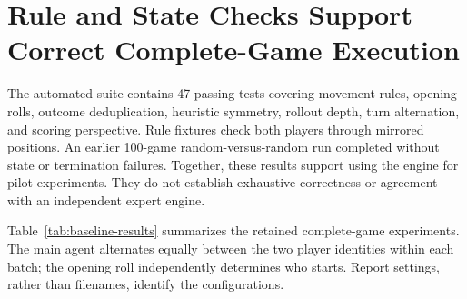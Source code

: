 \section{Rule and State Checks Support Correct Complete-Game Execution}

The automated suite contains 47 passing tests covering movement rules, opening rolls, outcome deduplication, heuristic symmetry, rollout depth, turn alternation, and scoring perspective. Rule fixtures check both players through mirrored positions. An earlier 100-game random-versus-random run completed without state or termination failures. Together, these results support using the engine for pilot experiments. They do not establish exhaustive correctness or agreement with an independent expert engine.

Table~\ref{tab:baseline-results} summarizes the retained complete-game experiments. The main agent alternates equally between the two player identities within each batch; the opening roll independently determines who starts. Report settings, rather than filenames, identify the configurations.


\begin{table}[htbp]
\centering\small
\caption{Complete-game performance of the evaluated agent against random and heuristic-only opponents. Wins and win rates refer to the evaluated agent. A rollout is one simulated continuation per distinct candidate; depth counts subsequent individual player turns, excluding the candidate, and simulations stop early at a terminal state. Guided moves maximize the acting player's immediate heuristic score; heuristic-only play evaluates candidates without simulating future turns. Each 40-game batch assigns the evaluated agent to each player identity 20 times. Rows pool different seed batches and vary in policy, rollout count, or depth, so the table is an exploratory summary rather than an isolated comparison of any single factor.}
\label{tab:baseline-results}
\end{table}

